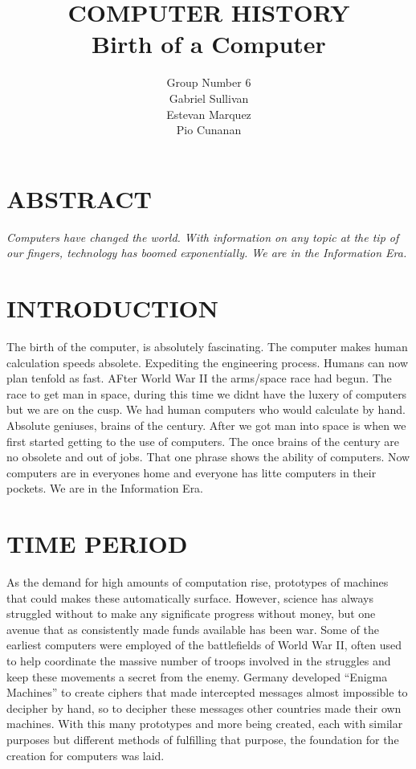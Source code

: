 \documentclass[letterpaper, 10 pt, conference]{IEEEconf}
\title{\LARGE \bf
COMPUTER HISTORY\\
\large Birth of a Computer
}
\author{Group Number 6\\
\small Gabriel Sullivan\\
\small Estevan Marquez\\
\small Pio Cunanan\\
}
\begin{document}
\thispagestyle{empty}
\pagestyle{empty}


\section*{ABSTRACT}
\textit{
Computers have changed the world. With information on any topic at the tip of our fingers, technology has boomed exponentially. We are in the Information Era.  
}

\section{INTRODUCTION}

The birth of the computer, is absolutely fascinating. The computer makes human calculation speeds absolete. Expediting the engineering process. Humans can now plan tenfold as fast. AFter World War II the arms/space race had begun. The race to get man in space, during this time we didnt have the luxery of computers but we are on the cusp. We had human computers who would calculate by hand. Absolute geniuses, brains of the century. After we got man into space is when we first started getting to the use of computers. The once brains of the century are no obsolete and out of jobs. That one phrase shows the ability of computers. Now computers are in everyones home and everyone has litte computers in their pockets. We are in the Information Era.

\section{TIME PERIOD}

As the demand for high amounts of computation rise, 
prototypes of machines that could makes these 
automatically surface. However, science has 
always struggled without to make any significate 
progress without money, but one avenue that as 
consistently made funds available has been war. 
Some of the earliest computers were employed of the 
battlefields of World War II, often used to help coordinate 
the massive number of troops involved in the struggles and 
keep these movements a secret from the enemy. Germany developed 
“Enigma Machines” to create ciphers that made intercepted messages 
almost impossible to decipher by hand, so to decipher these 
messages other countries made their own machines. With 
this many prototypes and more being created, each with 
similar purposes but different methods of fulfilling that purpose, 
the foundation for the creation for computers was laid.  
\end{document}
